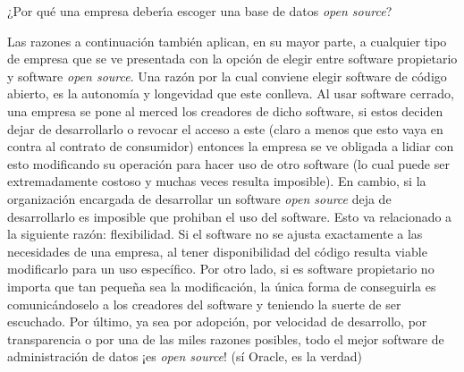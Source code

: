 \item ¿Por qué una empresa deberı́a escoger una base de datos \textit{open source}?

Las razones a continuación también aplican, en su mayor parte, a cualquier tipo de empresa que se ve presentada con la opción de elegir entre software propietario y software \textit{open source}. Una razón por la cual conviene elegir software de código abierto, es la autonomía y longevidad que este conlleva. Al usar software cerrado, una empresa se pone al merced los creadores de dicho software, si estos deciden dejar de desarrollarlo o revocar el acceso a este (claro a menos que esto vaya en contra al contrato de consumidor) entonces la empresa se ve obligada a lidiar con esto modificando su operación para hacer uso de otro software (lo cual puede ser extremadamente costoso y muchas veces resulta imposible). En cambio, si la organización encargada de desarrollar un software \textit{open source} deja de desarrollarlo es imposible que prohiban el uso del software. Esto va relacionado a la siguiente razón: flexibilidad. Si el software no se ajusta exactamente a las necesidades de una empresa, al tener disponibilidad del código resulta viable modificarlo para un uso específico. Por otro lado, si es software propietario no importa que tan pequeña sea la modificación, la única forma de conseguirla es comunicándoselo a los creadores del software y teniendo la suerte de ser escuchado. Por último, ya sea por adopción, por velocidad de desarrollo, por transparencia o por una de las miles razones posibles, todo el mejor software de administración de datos ¡es \textit{open source}! (sí Oracle, es la verdad)
